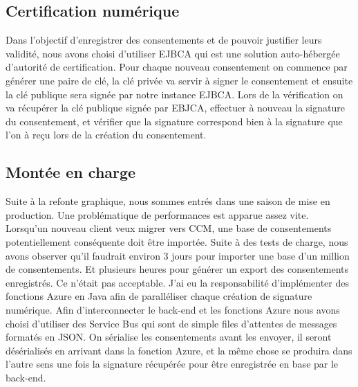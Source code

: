 \documentclass[12pt, a4paper]{report}
\newcommand\tab[1][1cm]{\hspace*{#1}}
\begin{document}
            \subsection{Certification numérique}
                Dans l'objectif d'enregistrer des consentements et de pouvoir justifier leurs validité, nous avons choisi d'utiliser EJBCA qui est une solution auto-hébergée d'autorité de certification.\newline
                Pour chaque nouveau consentement on commence par générer une paire de clé, la clé privée va servir à signer le consentement et ensuite la clé publique sera signée par notre instance EJBCA.\newline
                Lors de la vérification on va récupérer la clé publique signée par EBJCA, effectuer à nouveau la signature du consentement, et vérifier que la signature correspond bien à la signature que l'on à reçu lors de la création du consentement.\newline
            \subsection{Montée en charge}
                \tab{} Suite à la refonte graphique, nous sommes entrés dans une saison de mise en production.\newline
                Une problématique de performances est apparue assez vite. Lorsqu'un nouveau client veux migrer vers CCM, une base de consentements potentiellement conséquente doit être importée. \newline
                Suite à des tests de charge, nous avons observer qu'il faudrait environ 3 jours pour importer une base d'un million de consentements. Et plusieurs heures pour générer un export des consentements enregistrés. Ce n'était pas acceptable.\newline
                J'ai eu la responsabilité d'implémenter des fonctions Azure en Java afin de paralléliser chaque création de signature numérique.
                Afin d'interconnecter le back-end et les fonctions Azure nous avons choisi d'utiliser des Service Bus qui sont de simple files d'attentes de messages formatés en JSON.\newline
                On sérialise les consentements avant les envoyer, il seront désérialisés en arrivant dans la fonction Azure, et la même chose se produira dans l'autre sens une fois la signature récupérée pour être enregistrée en base par le back-end.\newline
\end{document}
